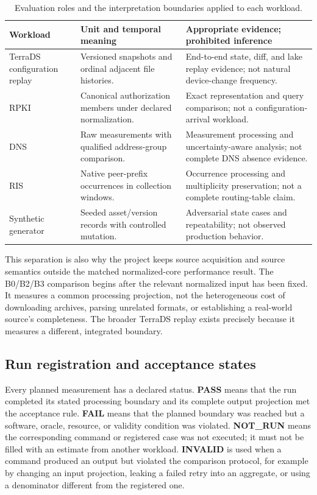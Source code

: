 \documentclass[a4paper,11pt]{article}
\begin{document}
\begin{table}[ht]
\centering
\caption{Evaluation roles and the interpretation boundaries applied to each workload.}
\label{tab:evidence-roles}
\small
\begin{tabularx}{\textwidth}{p{}p{}X}
\toprule
Workload & Unit and temporal meaning & Appropriate evidence; prohibited inference \\
\midrule
TerraDS configuration replay & Versioned snapshots and ordinal adjacent file histories. & End-to-end state, diff, and lake replay evidence; not natural device-change frequency. \\
RPKI & Canonical authorization members under declared normalization. & Exact representation and query comparison; not a configuration-arrival workload. \\
DNS & Raw measurements with qualified address-group comparison. & Measurement processing and uncertainty-aware analysis; not complete DNS absence evidence. \\
RIS & Native peer-prefix occurrences in collection windows. & Occurrence processing and multiplicity preservation; not a complete routing-table claim. \\
Synthetic generator & Seeded asset/version records with controlled mutation. & Adversarial state cases and repeatability; not observed production behavior. \\
\bottomrule
\end{tabularx}
\end{table}

This separation is also why the project keeps source acquisition and source semantics outside the matched normalized-core performance result. The B0/B2/B3 comparison begins after the relevant normalized input has been fixed. It measures a common processing projection, not the heterogeneous cost of downloading archives, parsing unrelated formats, or establishing a real-world source's completeness. The broader TerraDS replay exists precisely because it measures a different, integrated boundary.

\subsection{Run registration and acceptance states}

Every planned measurement has a declared status. \textbf{PASS} means that the run completed its stated processing boundary and its complete output projection met the acceptance rule. \textbf{FAIL} means that the planned boundary was reached but a software, oracle, resource, or validity condition was violated. \textbf{NOT\_RUN} means the corresponding command or registered case was not executed; it must not be filled with an estimate from another workload. \textbf{INVALID} is used when a command produced an output but violated the comparison protocol, for example by changing an input projection, leaking a failed retry into an aggregate, or using a denominator different from the registered one.
\end{document}
